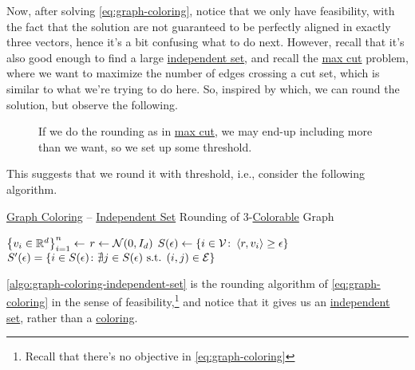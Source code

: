 Now, after solving \autoref{eq:graph-coloring}, notice that we only have feasibility, with the fact that the solution are not guaranteed to be perfectly aligned in exactly three vectors, hence it's a bit confusing what to do next. However, recall that it's also good enough to find a large \hyperref[def:independent-set]{independent set}, and recall the \hyperref[prb:max-cut]{max cut} problem, where we want to maximize the number of edges crossing a cut set, which is similar to what we're trying to do here. So, inspired by which, we can round the solution, but observe the following.

\begin{figure}[H]
	\centering
	\caption{If we do the rounding as in \hyperref[prb:max-cut]{max cut}, we may end-up including more than we want, so we set up some threshold.}
	\label{fig:3-coloring-threshold}
\end{figure}

This suggests that we round it with threshold, i.e., consider the following algorithm.

\begin{algorithm}[H]\label{algo:graph-coloring-independent-set}
	\DontPrintSemicolon
	\caption{\hyperref[prb:graph-coloring]{Graph Coloring} -- \hyperref[def:independent-set]{Independent Set} Rounding of \(3\)-\hyperref[def:coloring]{Colorable} Graph}
	\BlankLine
	\(\left\{ v_i \in \mathbb{\MakeUppercase{r}} ^d\right\} _{i=1}^n \gets\)\;
	\(r \gets \mathcal{\MakeUppercase{n}} (0, I_d)\)\label{algo:graph-coloring-independent-set-r}
	\(S(\epsilon )\gets\left\{ i\in \mathcal{\MakeUppercase{v}} \colon \left\langle r, v_i \right\rangle \geq \epsilon   \right\} \)
	\(S^\prime (\epsilon )= \left\{ i\in S(\epsilon )\colon \nexists j\in S(\epsilon ) \text{ s.t. } (i, j)\in \mathcal{\MakeUppercase{e}} \right\} \)
	\;
\end{algorithm}

\begin{remark}
	\autoref{algo:graph-coloring-independent-set} is the rounding algorithm of \autoref{eq:graph-coloring} in the sense of feasibility,\footnote{Recall that there's no objective in \autoref{eq:graph-coloring}} and notice that it gives us an \hyperref[def:independent-set]{independent set}, rather than a \hyperref[def:coloring]{coloring}.
\end{remark}